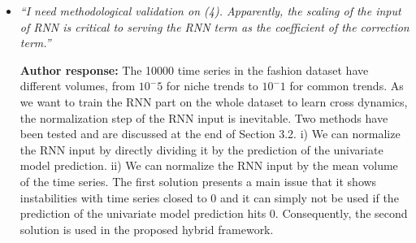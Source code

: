 \documentclass[10pt]{article} %
\begin{document}
\begin{itemize}
	\item {\em ``I need methodological validation on (4). Apparently, the scaling of the input of RNN is critical to serving the RNN term as the coefficient of the correction term.''} \medskip
	
	\textbf{Author response:} The 10000 time series in the fashion dataset have different volumes, from $10^-5$ for niche trends to $10^-1$ for common trends. As we want to train the RNN part on the whole dataset to learn cross dynamics, the normalization step of the RNN input is inevitable. Two methods have been tested and are discussed at the end of Section 3.2. i) We can normalize the RNN input by directly dividing it by the prediction of the univariate model prediction. ii) We can normalize the RNN input by the mean volume of the time series. The first solution presents a main issue that it shows instabilities with time series closed to 0 and it can simply not be used if the prediction of the univariate model prediction hits 0. Consequently, the second solution is used in the proposed hybrid framework.\\
\end{itemize}
\end{document}
